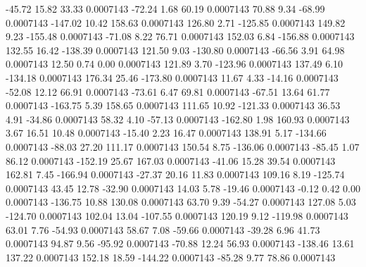       -45.72       15.82       33.33     0.0007143
      -72.24        1.68       60.19     0.0007143
       70.88        9.34      -68.99     0.0007143
     -147.02       10.42      158.63     0.0007143
      126.80        2.71     -125.85     0.0007143
      149.82        9.23     -155.48     0.0007143
      -71.08        8.22       76.71     0.0007143
      152.03        6.84     -156.88     0.0007143
      132.55       16.42     -138.39     0.0007143
      121.50        9.03     -130.80     0.0007143
      -66.56        3.91       64.98     0.0007143
       12.50        0.74        0.00     0.0007143
      121.89        3.70     -123.96     0.0007143
      137.49        6.10     -134.18     0.0007143
      176.34       25.46     -173.80     0.0007143
       11.67        4.33      -14.16     0.0007143
      -52.08       12.12       66.91     0.0007143
      -73.61        6.47       69.81     0.0007143
      -67.51       13.64       61.77     0.0007143
     -163.75        5.39      158.65     0.0007143
      111.65       10.92     -121.33     0.0007143
       36.53        4.91      -34.86     0.0007143
       58.32        4.10      -57.13     0.0007143
     -162.80        1.98      160.93     0.0007143
        3.67       16.51       10.48     0.0007143
      -15.40        2.23       16.47     0.0007143
      138.91        5.17     -134.66     0.0007143
      -88.03       27.20      111.17     0.0007143
      150.54        8.75     -136.06     0.0007143
      -85.45        1.07       86.12     0.0007143
     -152.19       25.67      167.03     0.0007143
      -41.06       15.28       39.54     0.0007143
      162.81        7.45     -166.94     0.0007143
      -27.37       20.16       11.83     0.0007143
      109.16        8.19     -125.74     0.0007143
       43.45       12.78      -32.90     0.0007143
       14.03        5.78      -19.46     0.0007143
       -0.12        0.42        0.00     0.0007143
     -136.75       10.88      130.08     0.0007143
       63.70        9.39      -54.27     0.0007143
      127.08        5.03     -124.70     0.0007143
      102.04       13.04     -107.55     0.0007143
      120.19        9.12     -119.98     0.0007143
       63.01        7.76      -54.93     0.0007143
       58.67        7.08      -59.66     0.0007143
      -39.28        6.96       41.73     0.0007143
       94.87        9.56      -95.92     0.0007143
      -70.88       12.24       56.93     0.0007143
     -138.46       13.61      137.22     0.0007143
      152.18       18.59     -144.22     0.0007143
      -85.28        9.77       78.86     0.0007143
